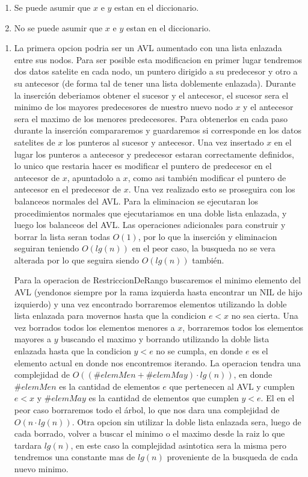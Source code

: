 \documentclass[10pt, a4paper]{report}
\begin{document}
\begin{enumerate}
 \item Se puede asumir que $x$ e $y$ estan en el diccionario. 
 \item No se puede asumir que $x$ e $y$ estan en el diccionario. 
\end{enumerate}

\begin{enumerate}
 \item La primera opcion podria ser un AVL aumentado con una lista enlazada entre sus nodos. Para ser posible esta modificacion en primer lugar tendremos dos datos satelite en cada nodo, un puntero dirigido a su predecesor y otro a su antecesor (de forma tal de tener una lista doblemente enlazada). Durante la inserci\'on deberiamos obtener el sucesor y el antecesor, el sucesor sera el minimo de los mayores predecesores de nuestro nuevo nodo $x$ y el antecesor sera el maximo de los menores predecesores. Para obtenerlos en cada paso durante la inserci\'on compararemos y guardaremos si corresponde en los datos satelites de $x$ los punteros al sucesor y antecesor. Una vez insertado $x$ en el lugar los punteros a antecesor y predecesor estaran correctamente definidos, lo unico que restaria hacer es modificar el puntero de predecesor en el antecesor de $x$, apuntadolo a $x$, como asi tambi\'en modificar el puntero de antecesor en el predecesor de $x$. Una vez realizado esto se proseguira con los balanceos normales 
del 
AVL. Para la eliminacion se ejecutaran los procedimientos normales que ejecutariamos en una doble lista enlazada, y luego los balanceos del AVL. Las operaciones adicionales para construir y borrar la lista seran todas $O(1)$, por lo que la inserci\'on y eliminacion seguiran teniendo $O(lg(n))$ en el peor caso, la busqueda no se vera alterada por lo que seguira siendo $O(lg(n))$ tambi\'en. 
 
 Para la operacion de RestriccionDeRango buscaremos el minimo elemento del AVL (yendonos siempre por la rama izquierda hasta encontrar un NIL de hijo izquierdo) y una vez encontrado borraremos elementos utilizando la doble lista enlazada para movernos hasta que la condicion $e < x$ no sea cierta. Una vez borrados todos los elementos menores a $x$, borraremos todos los elementos mayores a $y$ buscando el maximo y borrando utilizando la doble lista enlazada hasta que la condicion $y < e$ no se cumpla, en donde $e$ es el elemento actual en donde nos encontremos iterando. La operacion tendra una complejidad de $O((\#elemMen + \#elemMay) \cdot lg(n))$, en donde $\#elemMen$ es la cantidad de elementos $e$ que pertenecen al AVL y cumplen $e < x$ y $\#elemMay$ es la cantidad de elementos que cumplen $y < e$. El en el peor caso borraremos todo el \'arbol, lo que nos dara una complejidad de $O(n \cdot lg(n))$. Otra opcion sin utilizar la doble lista enlazada sera, luego de cada borrado, volver a buscar el minimo o el 
maximo desde la raiz lo que tardara $lg(n)$, en este caso la complejidad asintotica sera la misma pero tendremos una constante mas de $lg(n)$ proveniente de la busqueda de cada nuevo minimo.
 

\end{enumerate}
\end{document}
